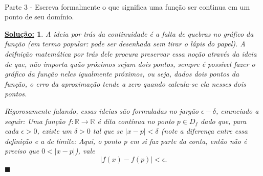 \documentclass{article}
\newtheorem*{sol*}{\underline{Solu\c c\~ao:}}
\renewcommand\qedsymbol{$\blacksquare$}
\begin{document}
\paragraph{} Parte 3 - Escreva formalmente o que significa uma fun\c c\~ao ser con\'tinua em um ponto de seu dom\'inio.
\begin{sol*}
	A ideia por tr\'as da continuidade \'e a falta de quebras no gr\'afico da fun\c c\~ao (em termo popular: pode ser desenhada sem tirar o l\'apis do papel). A deifni\c c\~ao matem\'atica por tr\'as dele procura preservar essa no\c c\~ao atrav\'es da ideia de que, n\~ao importa qu\~ao pr\'oximos sejam dois pontos, sempre \'e poss\'ivel fazer o gr\'afico da fun\c c\~ao neles igualmente pr\'oximos, ou seja, dados dois pontos da fun\c c\~ao, o erro da aproxima\c c\~ao tende a zero quando calcula-se ela nesses dois pontos. 

Rigorosamente falando, essas ideias s\~ao formuladas no jarg\~ao $\epsilon-\delta$, enunciado a seguir: Uma fun\c c\~ao $f:\mathbb{R}\rightarrow\mathbb{R}$ \'e dita cont\'inua no ponto $p\in{D_{f}}$ dado que, para cada $\epsilon > 0$, existe um $\delta > 0$ tal que se $|x - p| < \delta$ (note a diferen\c ca entre essa defini\c c\~ao e a de limite: Aqui, o ponto p em si faz parte da conta, ent\~ao n\~ao \'e preciso que $0 < |x - p|$), vale 
$$
|f(x) - f(p)| < \epsilon.
$$
\qedsymbol
\end{sol*}
\end{document}
